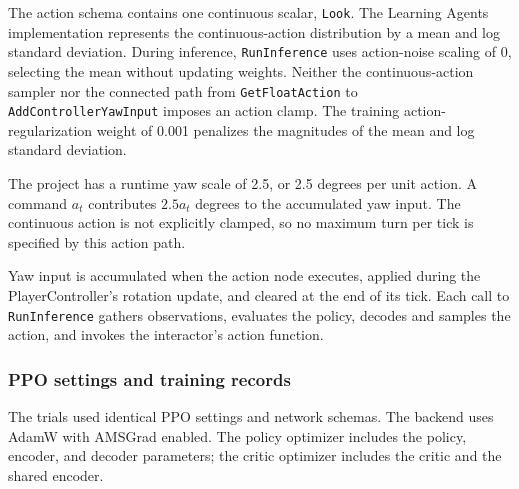 The action schema contains one continuous scalar, \texttt{Look}. The Learning Agents implementation represents the continuous-action distribution by a mean and log standard deviation. During inference, \texttt{RunInference} uses action-noise scaling of 0, selecting the mean without updating weights. Neither the continuous-action sampler nor the connected path from \texttt{GetFloatAction} to \texttt{AddControllerYawInput} imposes an action clamp. The training action-regularization weight of 0.001 penalizes the magnitudes of the mean and log standard deviation.

The project has a runtime yaw scale of 2.5, or 2.5 degrees per unit action. A command $a_t$ contributes $2.5a_t$ degrees to the accumulated yaw input. The continuous action is not explicitly clamped, so no maximum turn per tick is specified by this action path.

Yaw input is accumulated when the action node executes, applied during the PlayerController's rotation update, and cleared at the end of its tick. Each call to \texttt{RunInference} gathers observations, evaluates the policy, decodes and samples the action, and invokes the interactor's action function.

\subsubsection{PPO settings and training records}

The trials used identical PPO settings and network schemas. The backend uses AdamW with AMSGrad enabled. The policy optimizer includes the policy, encoder, and decoder parameters; the critic optimizer includes the critic and the shared encoder.

